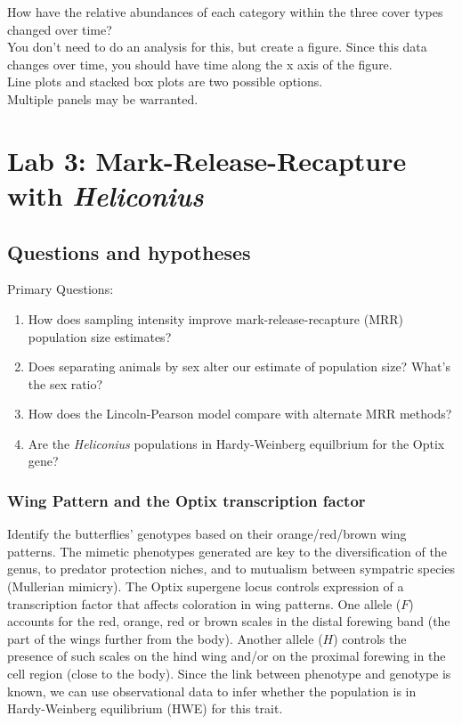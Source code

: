 \documentclass[]{book}
\providecommand{\tightlist}{%
  \setlength{\itemsep}{0pt}\setlength{\parskip}{0pt}}
\begin{document}
How have the relative abundances of each category within the three cover
types changed over time?\\
You don't need to do an analysis for this, but create a figure. Since
this data changes over time, you should have time along the x axis of
the figure.\\
Line plots and stacked box plots are two possible options.\\
Multiple panels may be warranted.

\chapter{\texorpdfstring{Lab 3: Mark-Release-Recapture with
\emph{Heliconius}}{Lab 3: Mark-Release-Recapture with Heliconius}}\label{Lab3}

\section{Questions and hypotheses}\label{questions-and-hypotheses-1}

Primary Questions:

\begin{enumerate}
\def\labelenumi{\arabic{enumi}.}
\tightlist
\item
  How does sampling intensity improve mark-release-recapture (MRR)
  population size estimates?
\item
  Does separating animals by sex alter our estimate of population size?
  What's the sex ratio?
\item
  How does the Lincoln-Pearson model compare with alternate MRR methods?
\item
  Are the \emph{Heliconius} populations in Hardy-Weinberg equilbrium for
  the Optix gene?
\end{enumerate}

\subsection{Wing Pattern and the Optix transcription
factor}\label{wing-pattern-and-the-optix-transcription-factor}

Identify the butterflies' genotypes based on their orange/red/brown wing
patterns. The mimetic phenotypes generated are key to the
diversification of the genus, to predator protection niches, and to
mutualism between sympatric species (Mullerian mimicry). The Optix
supergene locus controls expression of a transcription factor that
affects coloration in wing patterns. One allele (\(F\)) accounts for the
red, orange, red or brown scales in the distal forewing band (the part
of the wings further from the body). Another allele (\(H\)) controls the
presence of such scales on the hind wing and/or on the proximal forewing
in the cell region (close to the body). Since the link between phenotype
and genotype is known, we can use observational data to infer whether
the population is in Hardy-Weinberg equilibrium (HWE) for this trait.
\end{document}

